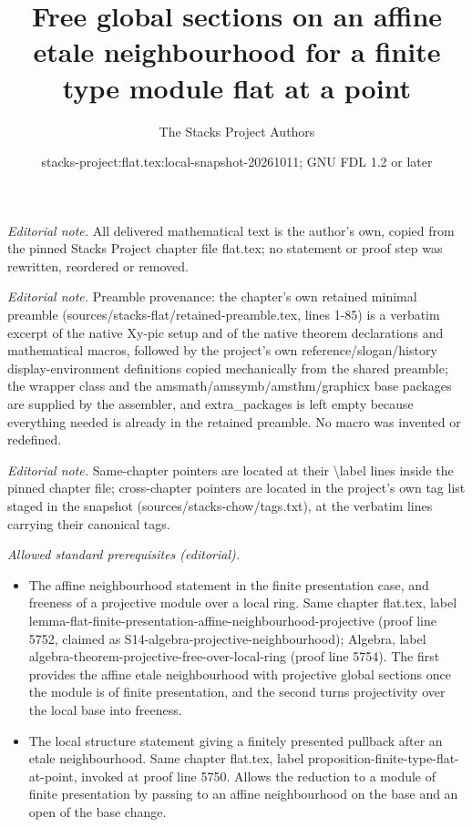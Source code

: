 \documentclass[10pt,a4paper]{amsart}
\title{Free global sections on an affine etale neighbourhood for a finite type module flat at a point}
\author{The Stacks Project Authors}
\date{stacks-project:flat.tex:local-snapshot-20261011; GNU FDL 1.2 or later}
\theoremstyle{plain}
\theoremstyle{definition}
\theoremstyle{remark}
\numberwithin{equation}{subsection}
\begin{document}
\maketitle
\noindent\textit{Editorial note.} All delivered mathematical text is the author's own, copied from the pinned Stacks Project chapter file flat.tex; no statement or proof step was rewritten, reordered or removed.\par\medskip
\noindent\textit{Editorial note.} Preamble provenance: the chapter's own retained minimal preamble (sources/stacks-flat/retained-preamble.tex, lines 1-85) is a verbatim excerpt of the native Xy-pic setup and of the native theorem declarations and mathematical macros, followed by the project's own reference/slogan/history display-environment definitions copied mechanically from the shared preamble; the wrapper class and the amsmath/amssymb/amsthm/graphicx base packages are supplied by the assembler, and extra\_packages is left empty because everything needed is already in the retained preamble. No macro was invented or redefined.\par\medskip
\noindent\textit{Editorial note.} Same-chapter pointers are located at their \textbackslash{}label lines inside the pinned chapter file; cross-chapter pointers are located in the project's own tag list staged in the snapshot (sources/stacks-chow/tags.txt), at the verbatim lines carrying their canonical tags.\par\medskip
\noindent\textit{Allowed standard prerequisites (editorial).}\begin{itemize}
\item The affine neighbourhood statement in the finite presentation case, and freeness of a projective module over a local ring. Same chapter flat.tex, label lemma-flat-finite-presentation-affine-neighbourhood-projective (proof line 5752, claimed as S14-algebra-projective-neighbourhood); Algebra, label algebra-theorem-projective-free-over-local-ring (proof line 5754). The first provides the affine etale neighbourhood with projective global sections once the module is of finite presentation, and the second turns projectivity over the local base into freeness.
\item The local structure statement giving a finitely presented pullback after an etale neighbourhood. Same chapter flat.tex, label proposition-finite-type-flat-at-point, invoked at proof line 5750. Allows the reduction to a module of finite presentation by passing to an affine neighbourhood on the base and an open of the base change.
\end{itemize}\medskip
\end{document}
